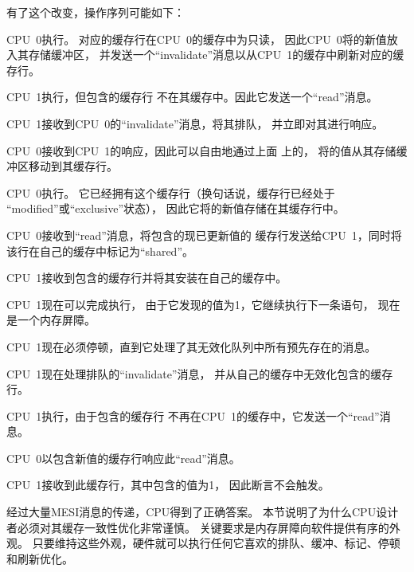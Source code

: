\begin{fcvref}
有了这个改变，操作序列可能如下：
\begin{sequence}
\item	CPU~0执行。
	对应的缓存行在CPU~0的缓存中为只读，
	因此CPU~0将的新值放入其存储缓冲区，
	并发送一个``invalidate''消息以从CPU~1的缓存中刷新对应的缓存行。
\item	CPU~1执行，但包含的缓存行
	不在其缓存中。因此它发送一个``read''消息。
\item	CPU~1接收到CPU~0的``invalidate''消息，将其排队，
	并立即对其进行响应。
\item	CPU~0接收到CPU~1的响应，因此可以自由地通过上面
	上的，
	将的值从其存储缓冲区移动到其缓存行。
\item	CPU~0执行。
	它已经拥有这个缓存行（换句话说，缓存行已经处于
	``modified''或``exclusive''状态），
	因此它将的新值存储在其缓存行中。
\item	CPU~0接收到``read''消息，将包含的现已更新值的
	缓存行发送给CPU~1，同时将该行在自己的缓存中标记为``shared''。
\item	CPU~1接收到包含的缓存行并将其安装在自己的缓存中。
\item	CPU~1现在可以完成执行，
	由于它发现的值为1，它继续执行下一条语句，
	现在是一个内存屏障。
\item	CPU~1现在必须停顿，直到它处理了其无效化队列中所有预先存在的消息。
\item	CPU~1现在处理排队的``invalidate''消息，
	并从自己的缓存中无效化包含的缓存行。
\item	CPU~1执行，由于包含的缓存行
	不再在CPU~1的缓存中，它发送一个``read''消息。
\item	CPU~0以包含新值的缓存行响应此``read''消息。
\item	CPU~1接收到此缓存行，其中包含的值为1，
	因此断言不会触发。
\end{sequence}
\end{fcvref}

经过大量MESI消息的传递，CPU得到了正确答案。
本节说明了为什么CPU设计者必须对其缓存一致性优化非常谨慎。
关键要求是内存屏障向软件提供有序的外观。
只要维持这些外观，硬件就可以执行任何它喜欢的排队、缓冲、标记、停顿和刷新优化。

\QuickQuizEnd

